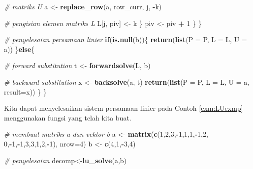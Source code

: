 \documentclass[
]{book}
\newenvironment{Shaded}{\begin{snugshade}}{\end{snugshade}}
\newcommand{\AttributeTok}[1]{\textcolor[rgb]{0.13,0.29,0.53}{#1}}
\newcommand{\CommentTok}[1]{\textcolor[rgb]{0.56,0.35,0.01}{\textit{#1}}}
\newcommand{\ControlFlowTok}[1]{\textcolor[rgb]{0.13,0.29,0.53}{\textbf{#1}}}
\newcommand{\DecValTok}[1]{\textcolor[rgb]{0.00,0.00,0.81}{#1}}
\newcommand{\FunctionTok}[1]{\textcolor[rgb]{0.13,0.29,0.53}{\textbf{#1}}}
\newcommand{\NormalTok}[1]{#1}
\newcommand{\OtherTok}[1]{\textcolor[rgb]{0.56,0.35,0.01}{#1}}
\newcommand{\SpecialCharTok}[1]{\textcolor[rgb]{0.81,0.36,0.00}{\textbf{#1}}}
\theoremstyle{definition}
\theoremstyle{definition}
\theoremstyle{definition}
\theoremstyle{definition}
\theoremstyle{remark}
\begin{document}
\begin{Shaded}
\begin{Highlighting}[]
  \CommentTok{\# matriks U}
\NormalTok{                    a }\OtherTok{\textless{}{-}} \FunctionTok{replace\_row}\NormalTok{(a, row\_curr, j, }\SpecialCharTok{{-}}\NormalTok{k)}
                    
  \CommentTok{\# pengisian elemen matriks L}
\NormalTok{                    L[j, piv] }\OtherTok{\textless{}{-}}\NormalTok{ k}
\NormalTok{                \}}
\NormalTok{            piv }\OtherTok{\textless{}{-}}\NormalTok{ piv }\SpecialCharTok{+} \DecValTok{1}
\NormalTok{        \}}
\NormalTok{    \}}
    
\CommentTok{\# penyelesaian persamaan linier}
    \ControlFlowTok{if}\NormalTok{(}\FunctionTok{is.null}\NormalTok{(b))\{}
      \FunctionTok{return}\NormalTok{(}\FunctionTok{list}\NormalTok{(}\AttributeTok{P =}\NormalTok{ P, }\AttributeTok{L =}\NormalTok{ L, }\AttributeTok{U =}\NormalTok{ a))}
\NormalTok{    \}}\ControlFlowTok{else}\NormalTok{\{}
      
      \CommentTok{\# forward substitution}
\NormalTok{      t }\OtherTok{\textless{}{-}} \FunctionTok{forwardsolve}\NormalTok{(L, b)}
      
      \CommentTok{\# backward substitution}
\NormalTok{      x }\OtherTok{\textless{}{-}} \FunctionTok{backsolve}\NormalTok{(a, t)}
      \FunctionTok{return}\NormalTok{(}\FunctionTok{list}\NormalTok{(}\AttributeTok{P =}\NormalTok{ P, }\AttributeTok{L =}\NormalTok{ L, }\AttributeTok{U =}\NormalTok{ a, }\AttributeTok{result=}\NormalTok{x))}
\NormalTok{     \}}
\NormalTok{\}}
\end{Highlighting}
\end{Shaded}

Kita dapat menyelesaikan sistem persamaan linier pada Contoh \ref{exm:LUexmp} menggunakan fungsi yang telah kita buat.

\begin{Shaded}
\begin{Highlighting}[]
\CommentTok{\# membuat matriks a dan vektor b}
\NormalTok{a }\OtherTok{\textless{}{-}} \FunctionTok{matrix}\NormalTok{(}\FunctionTok{c}\NormalTok{(}\DecValTok{1}\NormalTok{,}\DecValTok{2}\NormalTok{,}\DecValTok{3}\NormalTok{,}\SpecialCharTok{{-}}\DecValTok{1}\NormalTok{,}\DecValTok{1}\NormalTok{,}\DecValTok{1}\NormalTok{,}\SpecialCharTok{{-}}\DecValTok{1}\NormalTok{,}\DecValTok{2}\NormalTok{,}
              \DecValTok{0}\NormalTok{,}\SpecialCharTok{{-}}\DecValTok{1}\NormalTok{,}\SpecialCharTok{{-}}\DecValTok{1}\NormalTok{,}\DecValTok{3}\NormalTok{,}\DecValTok{3}\NormalTok{,}\DecValTok{1}\NormalTok{,}\DecValTok{2}\NormalTok{,}\SpecialCharTok{{-}}\DecValTok{1}\NormalTok{),}
            \AttributeTok{nrow=}\DecValTok{4}\NormalTok{)}
\NormalTok{b }\OtherTok{\textless{}{-}} \FunctionTok{c}\NormalTok{(}\DecValTok{4}\NormalTok{,}\DecValTok{1}\NormalTok{,}\SpecialCharTok{{-}}\DecValTok{3}\NormalTok{,}\DecValTok{4}\NormalTok{)}

\CommentTok{\# penyelesaian}
\NormalTok{decomp}\OtherTok{\textless{}{-}}\FunctionTok{lu\_solve}\NormalTok{(a,b)}
\end{Highlighting}
\end{Shaded}
\end{document}
